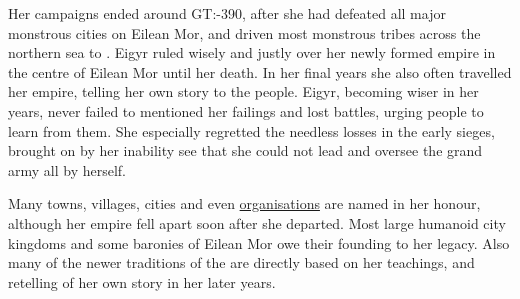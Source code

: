 Her campaigns ended around GT:-390, after she had defeated all major monstrous
cities on Eilean Mor, and driven most monstrous tribes across the northern sea
to . Eigyr ruled wisely and justly over her newly formed
empire in the centre of Eilean Mor until her death. In her final years she
also often travelled her empire, telling her own story to the people. Eigyr,
becoming wiser in her years, never failed to mentioned her failings and lost
battles, urging people to learn from them. She especially regretted the
needless losses in the early sieges, brought on by her inability see that she
could not lead and oversee the grand army all by herself.

Many towns, villages, cities and even \hyperref[sec:Wayfaerers
  Guild]{organisations} are named in her honour, although her empire fell
apart soon after she departed. Most large humanoid city kingdoms and some
baronies of Eilean Mor owe their founding to her legacy. Also many of the
newer traditions of the  are directly based on her
teachings, and retelling of her own story in her later years.
